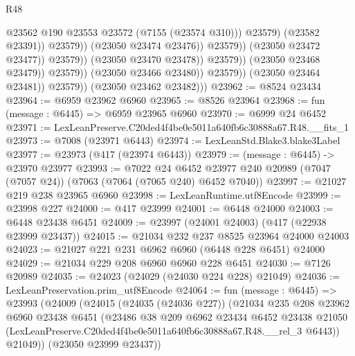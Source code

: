 \begin{lexlean}{R48}
\begin{coremodule}
                                                      @23562
                                                      @190
                                                      @23553
                                                      @23572
                                                      (@7155 (@23574 @310)))
                                                    @23579)
                                                  (@23582 @23391))
                                                @23579))
                                            (@23050 @23474 @23476))
                                          @23579))
                                      (@23050 @23472 @23477))
                                    @23579))
                                (@23050 @23470 @23478))
                              @23579))
                          (@23050 @23468 @23479))
                        @23579))
                    (@23050 @23466 @23480))
                  @23579))
              (@23050 @23464 @23481))
            @23579))
        (@23050 @23462 @23482)))
@23962 := @8524 @23434
@23964 := @6959 @23962 @6960
@23965 := @8526 @23964
@23968 := fun (message : @6445) => @6959 @23965 @6960
@23970 := @6999 @24 @6452
@23971 := LexLeanPreserve.C20ded4f4be0e5011a640fb6c30888a67.R48.__fits_1
@23973 := @7008 (@23971 @6443)
@23974 := LexLeanStd.Blake3.blake3Label
@23977 := @23973 (@417 (@23974 @6443))
@23979 := (message : @6445) -> @23970 @23977
@23993 := @7022
    @24
    @6452
    @23977
    @240
    @20989
    (@7047 (@7057 @24))
    (@7063 (@7064 (@7065 @240) @6452 @7040))
@23997 := @21027 @219 @238 @23965 @6960
@23998 := LexLeanRuntime.utf8Encode
@23999 := @23998 @227
@24000 := @417 @23999
@24001 := @6448 @24000
@24003 := @6448 @23438 @6451
@24009 := @23997 (@24001 @24003) (@417 (@22938 @23999 @23437))
@24015 := @21034 @232 @237 @8525 @23964 @24000 @24003
@24023 := @21027 @221 @231 @6962 @6960 (@6448 @228 @6451) @24000
@24029 := @21034 @229 @208 @6960 @6960 @228 @6451
@24030 := @7126 @20989
@24035 := @24023 (@24029 (@24030 @224 @228) @21049)
@24036 := LexLeanPreservation.prim_utf8Encode
@24064 := fun (message : @6445) =>
  @23993
    (@24009
      (@24015
        (@24035 (@24036 @227))
        (@21034
          @235
          @208
          @23962
          @6960
          @23438
          @6451
          (@23486
            @38
            @209
            @6962
            @23434
            @6452
            @23438
            @21050
            (LexLeanPreserve.C20ded4f4be0e5011a640fb6c30888a67.R48.__rel_3 @6443))
          @21049))
      (@23050 @23999 @23437))

\end{coremodule}
\end{lexlean}
